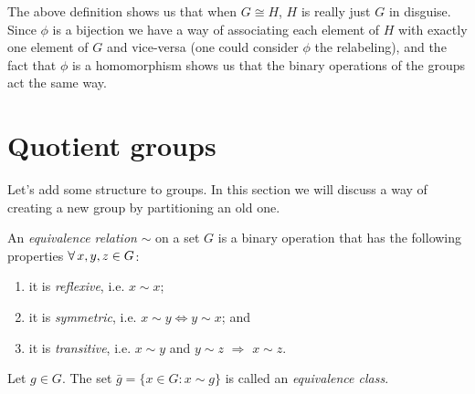 The above definition shows us that when $G\cong H$, $H$ is really just $G$ in
disguise. Since $\phi$ is a bijection we have a way of associating each element
of $H$ with exactly one element of $G$ and vice-versa (one could consider 
$\phi$ the relabeling), and the fact that $\phi$ is a homomorphism shows us
that the binary operations of the groups act the same way.

%

\section{Quotient groups}\label{sec:q}
Let's add some structure to groups. In this section we will discuss a way of
creating a new group by partitioning an old one.

  An {\it equivalence relation}  $\sim$ on a 
  set $G$ is a binary operation that has the following properties 
  $\operatorname{\forall} x,y,z\in G$:
  \begin{enumerate}
    \item it is {\it reflexive}, i.e. $x\sim x$;
    \item it is {\it symmetric}, i.e. 
          $x\sim y\Leftrightarrow y\sim x$; and
    \item it is {\it transitive}, i.e. $x\sim y$ and 
          $y\sim z$ $\Rightarrow$ $x\sim z$.
  \end{enumerate}
  Let $g\in G$. The set $\bar{g}=\{x\in G:x\sim g\}$ is called an {\it
  equivalence class}.

